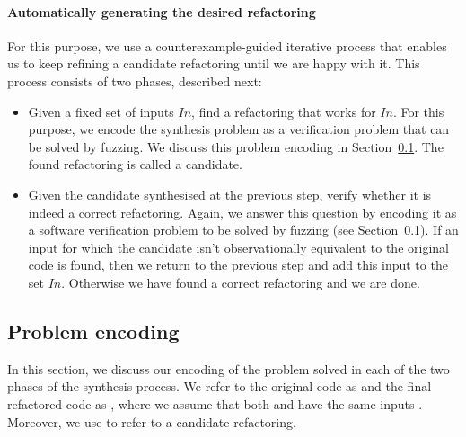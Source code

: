 \documentclass[runningheads,a4paper]{llncs}
\begin{document}
\paragraph{{\bf Automatically generating the desired refactoring}}

For this purpose, we use a counterexample-guided iterative process that enables us to keep refining a candidate refactoring until we are happy with it. This process consists of two phases, described next:
  \begin{itemize}
  \item[{\bf Phase 1:}] Given a fixed set of inputs $In$, find a refactoring that works for $In$. For this purpose, we encode   
    the synthesis problem as a verification problem that can be solved by fuzzing. We discuss this problem encoding in
    Section~\ref{sec:encoding}. The found refactoring is called a candidate.
  \item[{\bf Phase 2:}] Given the candidate synthesised at the previous step, verify whether it is indeed a correct refactoring.
    Again, we answer this question by encoding it as a software verification problem to be solved by fuzzing (see Section~\ref{sec:encoding}).
    If an input for which the candidate isn't observationally equivalent to the original code is found, then
    we return to the previous step and add this input to the set $In$. Otherwise we have found a correct refactoring and we are done.
  \end{itemize}




\subsection{Problem encoding}\label{sec:encoding}

In this section, we discuss our encoding of the problem solved in each
of the two phases of the synthesis process.  We refer to the original
code as  and the final refactored code as
, where we assume that both  and
 have the same inputs . Moreover,
we use  to refer to a candidate refactoring.

\end{document}
